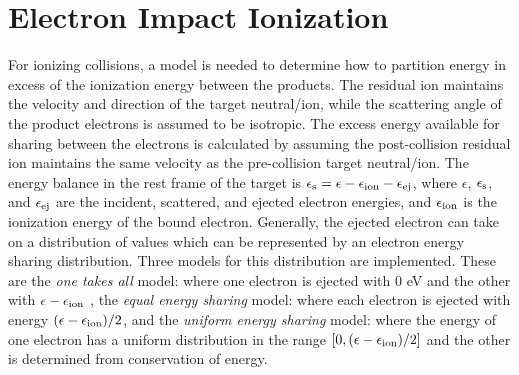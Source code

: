 \documentclass[letterpaper,10pt,english,openany,oneside]{sphinxmanual}
\begin{document}
\section{Electron Impact Ionization}
For ionizing collisions, a model is needed to determine how to partition energy in excess
of the ionization energy between the products. The residual ion maintains the velocity
and direction of the target neutral/ion, while the scattering angle of the product
electrons is assumed to be isotropic. The excess energy available for sharing between the
electrons is calculated by assuming the post-collision residual ion maintains the same
velocity as the pre-collision target neutral/ion. The energy balance in the rest frame of
the target is $\epsilon_{\rm s} = \epsilon - \epsilon_{\rm ion}-\epsilon_{\rm ej}$, where
$\epsilon$, $\epsilon_{\rm s}$, and $\epsilon_{\rm ej}$ are the incident, scattered, and
ejected electron energies, and $\epsilon_{\rm ion}$ is the ionization energy of the bound
electron. Generally, the ejected electron can take on a distribution of values which can
be represented by an electron energy sharing distribution. Three models for this
distribution are implemented.  These are the \emph{one takes all} model: where one
electron is ejected with 0 eV and the other with $\epsilon - \epsilon_{\rm ion}$
\cite{Hagelaar_2005}, the \emph{equal energy sharing} model\cite{Hagelaar_2005}:
where each electron is ejected with energy $(\epsilon - \epsilon_{\rm ion})/2$, and the
\emph{uniform energy sharing} model\cite{CHUNG20053}: where the energy of one electron
has a uniform distribution in the range $[0,(\epsilon - \epsilon_{\rm ion})/2]$ and the
other is determined from conservation of energy.



\end{document}

